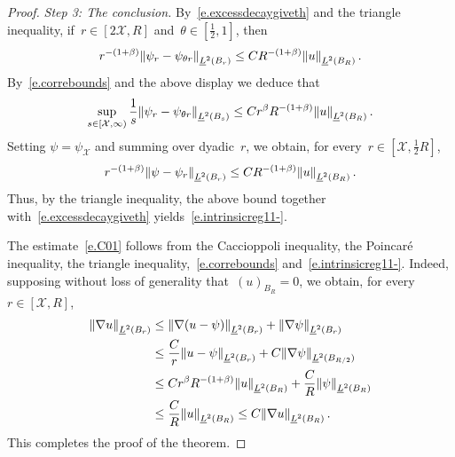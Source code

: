\documentclass[11pt]{article} %
\numberwithin{equation}{section}
\theoremstyle{definition}
\let\originalleft\left
\let\originalright\right
\renewcommand{\left}{\mathopen{}\mathclose\bgroup\originalleft}
\renewcommand{\right}{\aftergroup\egroup\originalright}
\newcommand{\X}{\mathcal{X}}
\begin{document}
\begin{proof}
\smallskip

\emph{Step 3: The conclusion.}
By~\eqref{e.excessdecaygiveth} and the triangle inequality, if~$r\in [2\X, R]$ and~$\theta \in [\frac12, 1]$, then 
\begin{equation}
\label{e.catchme}
r^{-(1+\beta)} \left\| \psi_{r} - \psi_{\theta r} \right\|_{\underline{L}^2(B_{r})}
\leq 
C R^{-(1+\beta)} \left\| u \right\|_{\underline{L}^2(B_{R})}
\,.
\end{equation}
By~\eqref{e.correbounds} and the above display we deduce that 
\begin{align*}  
\sup_{s \in [\X , \infty)} \frac1s \left\| \psi_{r} - \psi_{\theta r} \right\|_{\underline{L}^2(B_{s})}
\leq 
C r^\beta R^{-(1+\beta)} \left\| u \right\|_{\underline{L}^2(B_{R})}
\,.
\end{align*}
Setting $\psi = \psi_\X$ and summing over dyadic~$r$, we obtain, for every~$r\in[\X,\frac12R]$,  
\begin{equation*}
r^{-(1+\beta)} \left\| \psi  - \psi_{r} \right\|_{\underline{L}^2(B_{r})}
\leq 
C R^{-(1+\beta)} \left\| u \right\|_{\underline{L}^2(B_{R})}
\,.
\end{equation*}
Thus, by the triangle inequality, the above bound together with~\eqref{e.excessdecaygiveth} yields~\eqref{e.intrinsicreg11-}.

\smallskip

The estimate~\eqref{e.C01} follows from the Caccioppoli inequality, the Poincar\'e inequality, the triangle inequality,~\eqref{e.correbounds} and~\eqref{e.intrinsicreg11-}. Indeed, supposing without loss of generality that~$(u)_{B_R} = 0$, we obtain, for every~$r\in[\X,R]$, 
\begin{align*}
\left\| \nabla u \right\|_{\underline{L}^2(B_r)} 
&
\leq 
\left\| \nabla (u-\psi) \right\|_{\underline{L}^2(B_r)}  + \left\| \nabla \psi \right\|_{\underline{L}^2(B_r)} 
\\ & 
\leq 
\frac{C}{r} 
\left\| u-\psi  \right\|_{\underline{L}^2(B_r)}  
+ 
C \left\| \nabla \psi \right\|_{\underline{L}^2(B_{R/2})} 
\\ & 
\leq 
Cr^\beta R^{-(1+\beta)} 
\left\| u \right\|_{\underline{L}^2(B_R)} 
+
\frac{C}{R} \left\| \psi \right\|_{\underline{L}^2(B_R)} 
\\ & 
\leq
\frac{C}{R} \left\| u \right\|_{\underline{L}^2(B_R)} 
\leq 
C \left\| \nabla u \right\|_{\underline{L}^2(B_R)} \,.
\end{align*}
This completes the proof of the theorem. 
\end{proof}
\end{document}
